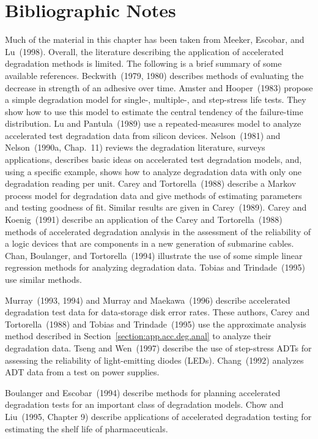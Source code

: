 \section*{Bibliographic Notes}
Much of the material in this chapter has been taken from Meeker,
Escobar, and Lu~(1998).  Overall, the literature describing the
application of accelerated degradation methods is limited.  The
following is a brief summary of some available references.
Beckwith~(1979, 1980) describes methods of evaluating the decrease
in strength of an adhesive over time. Amster and Hooper~(1983)
propose a simple degradation model for single-, multiple-, and
step-stress life tests.  They show how to use this model to estimate
the central tendency of the failure-time distribution.  Lu and
Pantula~(1989) use a repeated-measures model to analyze accelerated
test degradation data from silicon devices.  Nelson~(1981) and
Nelson~(1990a, Chap.\ 11) reviews the degradation literature,
surveys applications, describes basic ideas on accelerated test
degradation models, and, using a specific example, shows how to
analyze degradation data with only one degradation reading per unit.
Carey and Tortorella~(1988) describe a Markov process model for
degradation data and give methods of estimating parameters and
testing goodness of fit.  Similar results are given in Carey~(1989).
Carey and Koenig~(1991) describe an application of the Carey and
Tortorella~(1988) methods of accelerated degradation analysis in the
assessment of the reliability of a logic devices that are components
in a new generation of submarine cables.  Chan, Boulanger, and
Tortorella~(1994) illustrate the use of some simple linear
regression methods for analyzing degradation data.  Tobias and
Trindade~(1995) use similar methods.

Murray~(1993, 1994) and Murray and Maekawa~(1996) describe
accelerated degradation test data for data-storage disk error
rates. These authors, Carey and Tortorella~(1988) and Tobias and
Trindade~(1995) use the approximate analysis method described in
Section~\ref{section:app.acc.deg.anal} to analyze their degradation
data. Tseng and Wen~(1997) describe the use of step-stress ADTs for
assessing the reliability of light-emitting diodes
(LEDs). Chang~(1992) analyzes ADT data from a test on power
supplies.

Boulanger and Escobar~(1994) describe methods for planning
accelerated degradation tests for an important class of degradation
models.  Chow and Liu~(1995, Chapter 9) describe applications of
accelerated degradation testing for estimating the shelf life of
pharmaceuticals.
